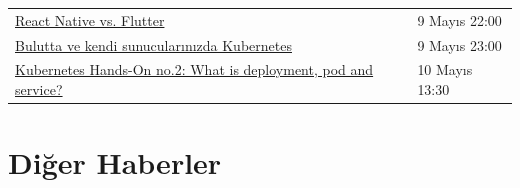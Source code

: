 \documentclass[11pt]{article}
\begin{document}
\begin{longtable}{|p{9.5cm}|l|}
\href{https://kommunity.com/devnot-yazilimci-bulusmalari/events/react-native-vs-flutter-02a9d600}{React Native vs. Flutter} & 9 Mayıs 22:00\\
\href{https://kommunity.com/cloud-and-serverless-turkey/events/ramazan-ozel-5-bulutta-ve-kendi-sunucularinizda-kubernetes-dfec6279}{Bulutta ve kendi sunucularınızda Kubernetes} & 9 Mayıs 23:00\\
\href{https://kommunity.com/cloud-and-serverless-turkey/events/kubernetes-hands-on-2-what-is-deployment-pod-and-service-06b07bda}{Kubernetes Hands-On no.2: What is deployment, pod and service?} & 10 Mayıs 13:30\\
\hline
\end{longtable}
\section{Diğer Haberler}
\label{sec:org7246ad6}
\end{document}
